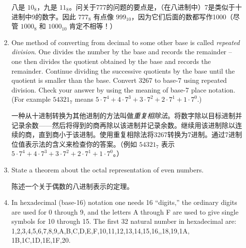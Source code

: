 \begin{enumerate}
{  八是 $10_8$，九是 $11_8$。问关于777的问题的要点是，（在八进制中）7是类似于十进制中9的数字。因此 $777_8$ 有点像 $999_{10}$，因为它们后面的数都写作1000（尽管 $1000_8$ 和 $1000_{10}$ 肯定不相等！）
  }
  
  \hintspagebreak
  
  \item One method of converting from decimal to some other base is
  called  \emph{repeated division}.
  One divides the number by the base
  and records the remainder -- one then divides the quotient obtained
  by the base and records the remainder.
  Continue dividing the 
  successive quotients by the base until the quotient is smaller than
  the base.
  Convert 3267 to base-7 using repeated division.  Check 
  your answer by using the meaning of base-7 place notation.
  (For
  example $54321_7$ means $5\cdot7^4 + 4\cdot7^3 + 3 \cdot7^2 +
  2\cdot7^1 + 1\cdot7^0$.)
  
  一种从十进制转换为其他进制的方法叫做\emph{重复相除法}。将数字除以目标进制并记录余数——然后将得到的商再除以该进制并记录余数。继续用该进制除以连续的商，直到商小于该进制。使用重复相除法将3267转换为7进制。通过7进制位值表示法的含义来检查你的答案。（例如 $54321_7$ 表示 $5\cdot7^4 + 4\cdot7^3 + 3 \cdot7^2 + 2\cdot7^1 + 1\cdot7^0$。）
  
  \wbvfill
  
  
  \item State a theorem about the octal representation of even numbers.
  
  陈述一个关于偶数的八进制表示的定理。
  \wbvfill
  
  
  \item In hexadecimal (base-16) notation one needs 16 ``digits,'' the
    ordinary digits are used for 0 through 9, and the letters A through
    F are used to give single symbols for 10 through 15.  The first  32
    natural number in hexadecimal are:
    1,2,3,4,5,6,7,8,9,A,B,C,D,E,F,10,11,12,13,14,15,16,,18,19,1A,
    1B,1C,1D,1E,1F,20.
    

\end{enumerate}
